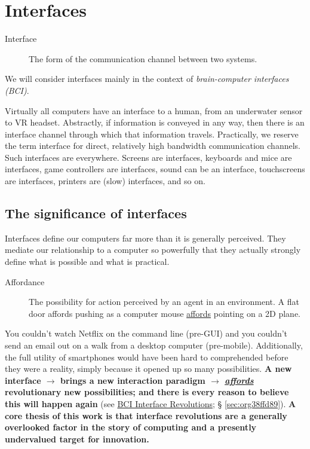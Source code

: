 \documentclass[logo,bsc,singlespacing,parskip]{infthesis}
\begin{document}
\chapter{Interfaces}
\label{sec:orge1241b6}
\begin{mdframed}
\begin{description}
\item[{Interface\label{Interface}}] The form of the communication channel between two systems.
\end{description}
\end{mdframed}

We will consider interfaces mainly in the context of \emph{brain-computer interfaces (BCI)}.

Virtually all computers have an interface to a human, from an underwater sensor to VR headset.
Abstractly, if information is conveyed in any way, then there is an interface channel through which that information travels.
Practically, we reserve the term interface for direct, relatively high bandwidth communication channels.
Such interfaces are everywhere.
Screens are interfaces, keyboards and mice are interfaces, game controllers are interfaces, sound can be an interface, touchscreens are interfaces, printers are (slow) interfaces, and so on.
\section{The significance of interfaces}
\label{sec:orge61f9ac}
Interfaces define our computers far more than it is generally perceived.
They mediate our relationship to a computer so powerfully that they actually strongly define what is possible and what is practical.

\begin{mdframed}
\begin{description}
\item[{\label{org26fb2b8}Affordance}] The possibility for action perceived by an agent in an environment. A flat door \label{org6d031db}affords pushing as a computer mouse \hyperref[org6d031db]{affords} pointing on a 2D plane.
\end{description}
\end{mdframed}

You couldn't watch Netflix on the command line (pre-GUI) and you couldn't send an email out on a walk from a desktop computer (pre-mobile).
Additionally, the full utility of smartphones would have been hard to comprehended before they were a reality, simply because it opened up so many possibilities.
\textbf{A new interface \(\rightarrow\) brings a new interaction paradigm \(\rightarrow\) \emph{\hyperref[org6d031db]{affords}} revolutionary new possibilities; and there is every reason to believe this will happen again} (see \hyperref[sec:org38ffd89]{BCI Interface Revolutions}; § \ref{sec:org38ffd89}).
\textbf{A core thesis of this work is that interface revolutions are a generally overlooked factor in the story of computing and a presently undervalued target for innovation.}
\end{document}
